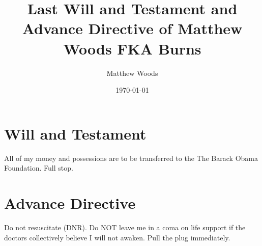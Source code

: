 \documentclass{article}
\title{Last Will and Testament and Advance Directive of Matthew Woods FKA Burns}
\author{Matthew Woods}
\date{\today}
\begin{document}
\maketitle

\section{Will and Testament}
All of my money and possessions are to be transferred to the The Barack Obama Foundation. Full stop. 

\section{Advance Directive}
Do not resuscitate (DNR). Do NOT leave me in a coma on life support if the doctors collectively believe I will not awaken. Pull the plug immediately. 
\end{document}
